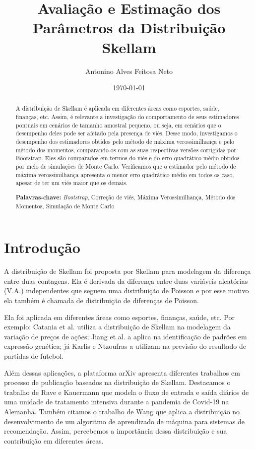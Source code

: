 \documentclass[12pt]{article}
\title{Avaliação e Estimação dos Parâmetros da Distribuição Skellam}
\author[1]{Antonino Alves Feitosa Neto}
\affil[1]{\href{mailto:antonino\_feitosa@yahoo.com.br} {antonino\_feitosa@yahoo.com.br}}
\affil[1]{Universidade Federal do Rio Grande do Norte}
\date{\today}
\theoremstyle{definition}
\begin{document}
\maketitle

\begin{abstract}
    A distribuição de Skellam é aplicada em diferentes áreas como esportes, saúde, finanças, etc. Assim, é relevante a investigação do comportamento de seus estimadores pontuais em cenários de tamanho amostral pequeno, ou seja, em cenários que o desempenho deles pode ser afetado pela presença de viés. Desse modo, investigamos o desempenho dos estimadores obtidos pelo método de máxima verossimilhança e pelo método dos momentos, comparando-os com as suas respectivas versões corrigidas por Bootstrap. Eles são comparados em termos do viés e do erro quadrático médio obtidos por meio de simulações de Monte Carlo. Verificamos que o estimador pelo método de máxima verossimilhança apresenta o menor erro quadrático médio em todos os caso, apesar de ter um viés maior que os demais. 
    
    \hfill
    
    \textbf{Palavras-chave:} \textit{Bootstrap}, Correção de viés, Máxima Verossimilhança, Método dos Momentos, Simulação de Monte Carlo
\end{abstract}

\section{Introdução}

A distribuição de Skellam foi proposta por Skellam \cite{skellam1946} para modelagem da diferença entre duas contagens. Ela é derivada da diferença entre duas variáveis aleatórias (V.A.) independentes que seguem uma distribuição de Poisson e por esse motivo ela também é chamada de distribuição de diferenças de Poisson.

Ela foi aplicada em diferentes áreas como esportes, finanças, saúde, etc. Por exemplo: Catania et al. \cite{catania2022} utiliza a distribuição de Skellam na modelagem da variação de preços de ações; Jiang et al. \cite{jiang2014} a aplica na identificação de padrões em expressão genética; já Karlis e Ntzoufras \cite{karlis2008} a utilizam na previsão do resultado de partidas de futebol.

Além dessas aplicações, a plataforma arXiv \cite{arXiv} apresenta diferentes trabalhos em processo de publicação baseados na distribuição de Skellam. Destacamos o trabalho de Rave e Kauermann \cite{rave2023} que modela o fluxo de entrada e saída diários de uma unidade de tratamento intensiva durante a pandemia de Covid-19 na Alemanha. Também citamos o trabalho de Wang \cite{wang2023} que aplica a distribuição no desenvolvimento de um algoritmo de aprendizado de máquina para sistemas de recomendação. Assim, percebemos a importância dessa distribuição e sua contribuição em diferentes áreas.
\end{document}
